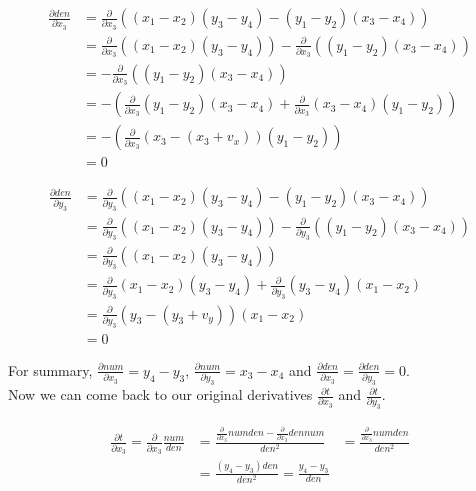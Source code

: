 \documentclass[fleqn]{article}
\begin{document}
\begin{equation}
\begin{aligned}
    \frac{\partial den}{\partial x_3}
    &= \frac{\partial}{\partial x_3} ((x_1 - x_2) (y_3 - y_4) - (y_1 - y_2) (x_3 - x_4)) \\
    &= \frac{\partial}{\partial x_3} ((x_1 - x_2) (y_3 - y_4)) - \frac{\partial}{\partial x_3} ((y_1 - y_2) (x_3 - x_4)) \\
    &= - \frac{\partial}{\partial x_3} ((y_1 - y_2) (x_3 - x_4)) \\
    &= - (\frac{\partial}{\partial x_3} (y_1 - y_2) (x_3 - x_4) + \frac{\partial}{\partial x_3} (x_3 - x_4) (y_1 - y_2)) \\
    &= - (\frac{\partial}{\partial x_3} (x_3 - (x_3 + v_x)) (y_1 - y_2)) \\
    &= 0
\end{aligned}
\end{equation}

\begin{equation}
\begin{aligned}
    \frac{\partial den}{\partial y_3}
    &= \frac{\partial}{\partial y_3} ((x_1 - x_2) (y_3 - y_4) - (y_1 - y_2) (x_3 - x_4)) \\
    &= \frac{\partial}{\partial y_3} ((x_1 - x_2) (y_3 - y_4)) - \frac{\partial}{\partial y_3} ((y_1 - y_2) (x_3 - x_4)) \\
    &= \frac{\partial}{\partial y_3} ((x_1 - x_2) (y_3 - y_4)) \\
    &= \frac{\partial}{\partial y_3} (x_1 - x_2) (y_3 - y_4) + \frac{\partial}{\partial y_3} (y_3 - y_4) (x_1 - x_2) \\
    &= \frac{\partial}{\partial y_3} (y_3 - (y_3 + v_y)) (x_1 - x_2) \\
    &= 0
\end{aligned}
\end{equation}

For summary, $\frac{\partial num}{\partial x_3} = y_4 - y_3$,
$\frac{\partial num}{\partial y_3} = x_3 - x_4$ and
$\frac{\partial den}{\partial x_3} = \frac{\partial den}{\partial y_3} = 0$.\\
Now we can come back to our original derivatives $\frac{\partial t}{\partial x_3}$
and $\frac{\partial t}{\partial y_3}$.

\begin{equation}
\begin{aligned}
    \frac{\partial t}{\partial x_3} = \frac{\partial}{\partial x_3} \frac{num}{den}
    &= \frac{\frac{\partial}{\partial x_3}num den - \frac{\partial}{\partial x_3} den num}{den^2}
    &= \frac{\frac{\partial}{\partial x_3}num den}{den^2} \\
    &= \frac{(y_4 - y_3) den}{den^2} = \frac{y_4 - y_3}{den}
\end{aligned}
\end{equation}
\end{document}
